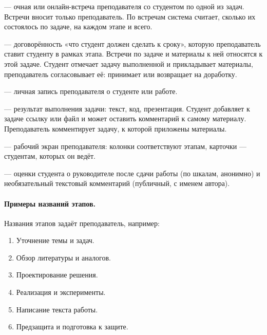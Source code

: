\documentclass[a4paper,12pt]{article}
\begin{document}
\begin{description}[leftmargin=2cm,style=nextline]
  \item[Встреча] — очная или онлайн-встреча преподавателя со студентом по одной из задач. Встречи вносит только преподаватель. По встречам система считает, сколько их состоялось по задаче, на каждом этапе и всего.
  \item[Задача] — договорённость «что студент должен сделать к сроку», которую преподаватель ставит студенту в рамках этапа. Встречи по задаче и материалы к ней относятся к этой задаче. Студент отмечает задачу выполненной и прикладывает материалы, преподаватель согласовывает её: принимает или возвращает на доработку.
  \item[Заметка] — личная запись преподавателя о студенте или работе.
  \item[Материал] — результат выполнения задачи: текст, код, презентация. Студент добавляет к задаче ссылку или файл и может оставить комментарий к самому материалу. Преподаватель комментирует задачу, к которой приложены материалы.
  \item[Доска] — рабочий экран преподавателя: колонки соответствуют этапам, карточки — студентам, которых он ведёт.
  \item[Отзыв] — оценки студента о руководителе после сдачи работы (по шкалам, анонимно) и необязательный текстовый комментарий (публичный, с именем автора).
\end{description}

\paragraph{Примеры названий этапов.} Названия этапов задаёт преподаватель, например:
\begin{enumerate}
  \item Уточнение темы и задач.
  \item Обзор литературы и аналогов.
  \item Проектирование решения.
  \item Реализация и эксперименты.
  \item Написание текста работы.
  \item Предзащита и подготовка к защите.
\end{enumerate}
\end{document}
